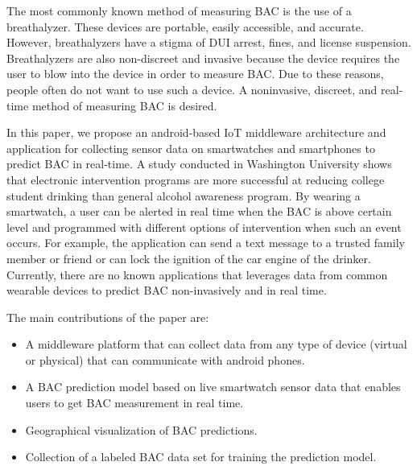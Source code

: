 The most commonly known method of measuring BAC is the use of a breathalyzer. These devices are portable, easily accessible, and accurate. However, breathalyzers have a stigma of DUI arrest, fines, and license suspension. Breathalyzers are also non-discreet and invasive because the device requires the user to blow into the device in order to measure BAC. Due to these reasons, people often do not want to use such a device. A noninvasive, discreet, and real-time method of measuring BAC is desired.

In this paper, we propose an android-based IoT middleware architecture and application for collecting sensor data on smartwatches and smartphones to predict BAC in real-time. A study conducted in Washington University \cite{Ward:2015} shows that electronic intervention programs are more successful at reducing college student drinking than general alcohol awareness program. By wearing a smartwatch, a user can be alerted in real time when the BAC is above certain level and programmed with different options of intervention when such an event occurs. For example, the application can send a text message to a trusted family member or friend or can lock the ignition of the car engine of the drinker. Currently, there are no known applications that leverages data from common wearable devices to predict BAC non-invasively and in real time.

The main contributions of the paper are:
\begin{itemize}
	\item A middleware platform that can collect data from any type of device (virtual or physical) that can communicate with android phones. 
	\item A BAC prediction model based on live smartwatch sensor data that enables users to get BAC measurement in real time.
	\item Geographical visualization of BAC predictions.
	\item Collection of a labeled BAC data set for training the prediction model.
\end{itemize}

